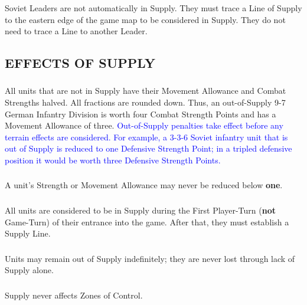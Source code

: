 \subsubsection{} Soviet Leaders are not automatically in Supply. They must trace a Line of Supply to the eastern edge of the game map to be considered in Supply. They do not need to trace a Line to another Leader.

\subsection{EFFECTS OF SUPPLY}

\subsubsection{} All units that are not in Supply have their Movement Allowance and Combat Strengths halved. All fractions are rounded down. Thus, an out-of-Supply 9-7 German Infantry Division is worth four Combat Strength Points and has a Movement Allowance of three. \textcolor{blue}{Out-of-Supply penalties take effect before any terrain effects are considered. For example, a 3-3-6 Soviet infantry unit that is out of Supply is reduced to one Defensive Strength Point; in a tripled defensive position it would be worth three Defensive Strength Points.}

\subsubsection{} A unit's Strength or Movement Allowance may never be reduced below \textbf{one}.

\subsubsection{} All units are considered to be in Supply during the First Player-Turn (\textbf{not} Game-Turn) of their entrance into the game. After that, they must establish a Supply Line.

\subsubsection{} Units may remain out of Supply indefinitely; they are never lost through lack of Supply alone.

\subsubsection{} Supply never affects Zones of Control.
